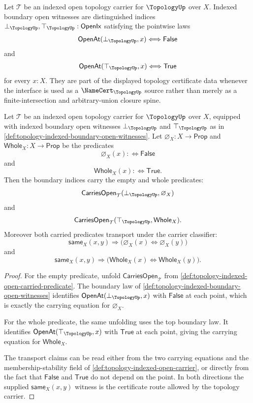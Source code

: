 \begin{definition}
\label{def:topology-indexed-boundary-open-witnesses}
Let $\mathcal{T}$ be an indexed open topology carrier for $\TopologyUp$ over $X$. Indexed boundary open witnesses are distinguished indices
$\bot_{\TopologyUp},\top_{\TopologyUp}:\mathsf{OpenIx}$ satisfying the pointwise laws
$$
\mathsf{OpenAt}(\bot_{\TopologyUp},x)
\Longleftrightarrow
\mathsf{False}
$$
and
$$
\mathsf{OpenAt}(\top_{\TopologyUp},x)
\Longleftrightarrow
\mathsf{True}
$$
for every $x:X$. They are part of the displayed topology certificate data whenever the interface is used as a $\NameCert_{\TopologyUp}$ source rather than merely as a finite-intersection and arbitrary-union closure spine.
\end{definition}

\begin{theorem}
\label{thm:topology-indexed-open-boundary-closure}
Let $\mathcal{T}$ be an indexed open topology carrier for $\TopologyUp$ over $X$, equipped with indexed boundary open witnesses $\bot_{\TopologyUp}$ and $\top_{\TopologyUp}$ as in \autoref{def:topology-indexed-boundary-open-witnesses}. Let $\varnothing_X:X\to\mathsf{Prop}$ and $\mathsf{Whole}_X:X\to\mathsf{Prop}$ be the predicates
$$
\varnothing_X(x):\Longleftrightarrow\mathsf{False}
$$
and
$$
\mathsf{Whole}_X(x):\Longleftrightarrow\mathsf{True}.
$$
Then the boundary indices carry the empty and whole predicates:
$$
\mathsf{CarriesOpen}_{\mathcal{T}}(\bot_{\TopologyUp},\varnothing_X)
$$
and
$$
\mathsf{CarriesOpen}_{\mathcal{T}}(\top_{\TopologyUp},\mathsf{Whole}_X).
$$
Moreover both carried predicates transport under the carrier classifier:
$$
\mathsf{same}_X(x,y)
\Longrightarrow
\bigl(\varnothing_X(x)\Longleftrightarrow\varnothing_X(y)\bigr)
$$
and
$$
\mathsf{same}_X(x,y)
\Longrightarrow
\bigl(\mathsf{Whole}_X(x)\Longleftrightarrow\mathsf{Whole}_X(y)\bigr).
$$
\end{theorem}
\begin{proof}
For the empty predicate, unfold $\mathsf{CarriesOpen}_{\mathcal{T}}$ from \autoref{def:topology-indexed-open-carried-predicate}. The boundary law of \autoref{def:topology-indexed-boundary-open-witnesses} identifies $\mathsf{OpenAt}(\bot_{\TopologyUp},x)$ with $\mathsf{False}$ at each point, which is exactly the carrying equation for $\varnothing_X$.

For the whole predicate, the same unfolding uses the top boundary law. It identifies $\mathsf{OpenAt}(\top_{\TopologyUp},x)$ with $\mathsf{True}$ at each point, giving the carrying equation for $\mathsf{Whole}_X$.

The transport claims can be read either from the two carrying equations and the membership-stability field of \autoref{def:topology-indexed-open-carrier}, or directly from the fact that $\mathsf{False}$ and $\mathsf{True}$ do not depend on the point. In both directions the supplied $\mathsf{same}_X(x,y)$ witness is the certificate route allowed by the topology carrier.
\end{proof}

